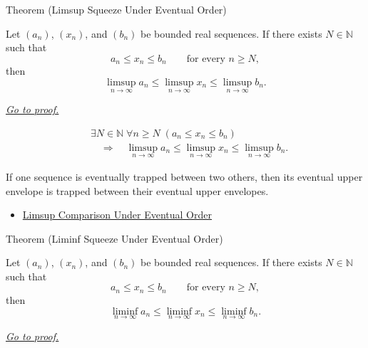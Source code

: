 
\begin{theorembox}{Theorem (Limsup Squeeze Under Eventual Order)}
\begin{theorem}
\label{thm:limsup-squeeze-under-eventual-order}
Let $(a_n)$, $(x_n)$, and $(b_n)$ be bounded real sequences. If there
exists $N\in\mathbb{N}$ such that
\[
  a_n\le x_n\le b_n
  \qquad\text{for every }n\ge N,
\]
then
\[
  \limsup_{n\to\infty}a_n
  \le
  \limsup_{n\to\infty}x_n
  \le
  \limsup_{n\to\infty}b_n.
\]

\smallskip
\noindent
\hyperref[prf:limsup-squeeze-under-eventual-order]{\textit{Go to proof.}}
\end{theorem}
\end{theorembox}

\begin{remark*}
\[
\begin{aligned}
&\exists N\in\mathbb{N}\;\forall n\ge N\;(a_n\le x_n\le b_n)\\
&\quad\Longrightarrow\quad
\limsup_{n\to\infty}a_n
\le
\limsup_{n\to\infty}x_n
\le
\limsup_{n\to\infty}b_n.
\end{aligned}
\]
\end{remark*}

\begin{remark*}[Interpretation]
If one sequence is eventually trapped between two others, then its eventual
upper envelope is trapped between their eventual upper envelopes.
\end{remark*}

\begin{remark*}[Dependencies]\hfill
\begin{itemize}
  \item \hyperref[thm:limsup-comparison-under-eventual-order]{Limsup Comparison Under Eventual Order}
\end{itemize}
\end{remark*}


\begin{theorembox}{Theorem (Liminf Squeeze Under Eventual Order)}
\begin{theorem}
\label{thm:liminf-squeeze-under-eventual-order}
Let $(a_n)$, $(x_n)$, and $(b_n)$ be bounded real sequences. If there
exists $N\in\mathbb{N}$ such that
\[
  a_n\le x_n\le b_n
  \qquad\text{for every }n\ge N,
\]
then
\[
  \liminf_{n\to\infty}a_n
  \le
  \liminf_{n\to\infty}x_n
  \le
  \liminf_{n\to\infty}b_n.
\]

\smallskip
\noindent
\hyperref[prf:liminf-squeeze-under-eventual-order]{\textit{Go to proof.}}
\end{theorem}
\end{theorembox}

